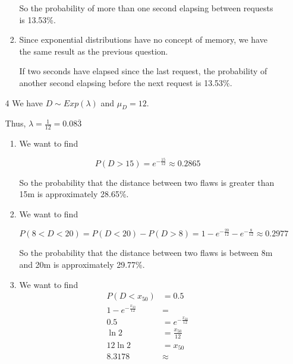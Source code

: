 \documentclass[12pt,letterpaper]{article}
\begin{document}
\begin{enumerate}
\begin{enumerate}
\begin{enumerate}[label=(\arabic*)]
              So the probability of more than one second elapsing between requests is 13.53\%.
            \item
              Since exponential distributions have no concept of memory,
              we have the same result as the previous question.

              If two seconds have elapsed since the last request,
              the probability of another second elapsing before the next request is 13.53\%.
          \end{enumerate}
        \item [4]
          We have $D \sim Exp(\lambda)$ and $\mu_D = 12$.

          Thus, $\lambda = \frac{1}{12} = 0.08\overline{3}$
          \begin{enumerate}[label=(\arabic*)]
            \item
              We want to find

              \[
                P(D > 15) = e^{-\frac{15}{12}} \approx 0.2865
              \]

              So the probability that the distance between two flaws is greater than 15m is approximately 28.65\%.
            \item
              We want to find

              \[
                P(8 < D < 20) = P(D < 20) - P(D > 8) = 1 - e^{-\frac{20}{12}} - e^{-\frac{8}{12}} \approx 0.2977
              \]

              So the probability that the distance between two flaws is between 8m and 20m is approximately 29.77\%.
            \item
              We want to find
              \begin{align*}
                P(D < x_{50}) &= 0.5 \\
                1 - e^{-\frac{x_{50}}{12}} &= \\
                0.5 &= e^{-\frac{x_{50}}{12}} \\
                \ln 2 &= \frac{x_{50}}{12} \\
                12 \ln 2 &= x_{50} \\
                8.3178 &\approx
              \end{align*}


\end{enumerate}
\end{enumerate}
\end{enumerate}
\end{document}
